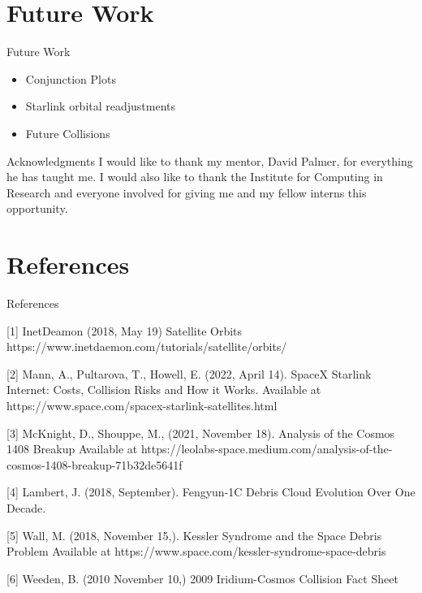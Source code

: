 \documentclass{beamer}
\begin{document}
\section{Future Work}
\begin{frame}{Future Work}
\begin{itemize}
\item Conjunction Plots
\item Starlink orbital readjustments
\item Future Collisions
\end{itemize}
\end{frame}

\begin{frame}{Acknowledgments}
I would like to thank my mentor, David Palmer, for everything he has taught me.
\vfill
I would also like to thank the Institute for Computing in Research and everyone involved for giving me and my fellow interns this opportunity.
\end{frame}

\section{References}
\begin{frame}{References}

\small [1] InetDeamon (2018, May 19) Satellite Orbits https://www.inetdaemon.com/tutorials/satellite/orbits/

\small [2] Mann, A., Pultarova, T.,  Howell, E. (2022, April 14). SpaceX Starlink Internet: Costs, Collision Risks and How it Works. Available at https://www.space.com/spacex-starlink-satellites.html

\small [3] McKnight, D., Shouppe, M., (2021, November 18). Analysis of the Cosmos 1408 Breakup Available at https://leolabs-space.medium.com/analysis-of-the-cosmos-1408-breakup-71b32de5641f

\small [4] Lambert, J. (2018, September). Fengyun-1C Debris Cloud Evolution Over One Decade. %

\small [5]  Wall, M. (2018, November 15,). Kessler Syndrome and the Space Debris Problem Available at https://www.space.com/kessler-syndrome-space-debris

\small [6] Weeden, B. (2010 November 10,) 2009 Iridium-Cosmos Collision Fact Sheet %

\end{frame}
\end{document}
